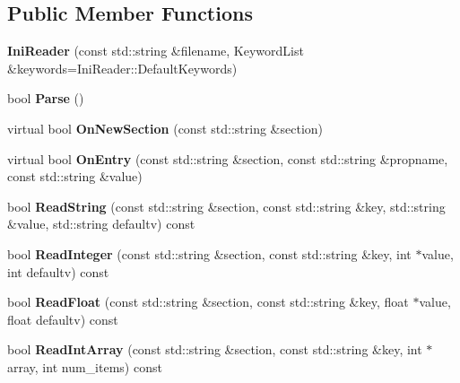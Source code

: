 \subsection*{Public Member Functions}
\begin{DoxyCompactItemize}
\item 
\hypertarget{class_ini_reader_a82efab9f45a3ef170308c01e7d688704}{
{\bfseries IniReader} (const std::string \&filename, KeywordList \&keywords=IniReader::DefaultKeywords)}
\label{class_ini_reader_a82efab9f45a3ef170308c01e7d688704}

\item 
\hypertarget{class_ini_reader_a1bd6e9ece9c0d3c46d5bbd0025ae805a}{
bool {\bfseries Parse} ()}
\label{class_ini_reader_a1bd6e9ece9c0d3c46d5bbd0025ae805a}

\item 
\hypertarget{class_ini_reader_a8dcfb46e96024bd5e72f04f34400c705}{
virtual bool {\bfseries OnNewSection} (const std::string \&section)}
\label{class_ini_reader_a8dcfb46e96024bd5e72f04f34400c705}

\item 
\hypertarget{class_ini_reader_aea5cb71d20f2fa4dbebc4d6c5132fb13}{
virtual bool {\bfseries OnEntry} (const std::string \&section, const std::string \&propname, const std::string \&value)}
\label{class_ini_reader_aea5cb71d20f2fa4dbebc4d6c5132fb13}

\item 
\hypertarget{class_ini_reader_a13cd3f255268971c34cc1f71eaa35567}{
bool {\bfseries ReadString} (const std::string \&section, const std::string \&key, std::string \&value, std::string defaultv) const }
\label{class_ini_reader_a13cd3f255268971c34cc1f71eaa35567}

\item 
\hypertarget{class_ini_reader_aaaa75e9a2e701551fa4ae457a97186d4}{
bool {\bfseries ReadInteger} (const std::string \&section, const std::string \&key, int $\ast$value, int defaultv) const }
\label{class_ini_reader_aaaa75e9a2e701551fa4ae457a97186d4}

\item 
\hypertarget{class_ini_reader_a31ec351fdee3043fd582b3d6794e4234}{
bool {\bfseries ReadFloat} (const std::string \&section, const std::string \&key, float $\ast$value, float defaultv) const }
\label{class_ini_reader_a31ec351fdee3043fd582b3d6794e4234}

\item 
\hypertarget{class_ini_reader_a2684e1b63bce954e0ea7f7c794abae16}{
bool {\bfseries ReadIntArray} (const std::string \&section, const std::string \&key, int $\ast$array, int num\_\-items) const }
\label{class_ini_reader_a2684e1b63bce954e0ea7f7c794abae16}


\end{DoxyCompactItemize}
